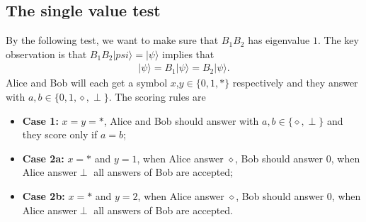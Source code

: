 \documentclass[11pt,letterpaper]{article}
\newcommand{\ket}[1]{|#1\rangle}
\newcommand{\bra}[1]{\langle#1|}
\DeclareMathOperator{\spn}{span}
\newcommand{\1}{\mathbb{1}}
\theoremstyle{definition}
\begin{document}
\subsection{The single value test}
By the following test, we want to make sure that $B_1B_2$ has eigenvalue $1$.
The key observation is that $B_1B_2\ket{psi} = \ket{\psi}$ implies that 
\begin{align}
	\ket{\psi} = B_1\ket{\psi} = B_2 \ket{\psi}.
\end{align}
Alice and Bob will each get a symbol $x$,$y \in \{ 0, 1, \ast\}$ respectively and they answer with $a,b \in \{0,1,\diamond,\perp\}$. 
The scoring rules are
\begin{itemize}
	\item \textbf{Case 1:} $x = y = \ast$, Alice and Bob should answer with $a, b \in \{\diamond, \perp\}$ and 
	they score only if $a = b$;
	\item \textbf{Case 2a:} $x =\ast$ and $y = 1$,  when Alice answer $\diamond$, Bob should answer $0$, when 
	Alice answer$\perp$ all answers of Bob are accepted;
	\item \textbf{Case 2b:} $x = \ast$ and $y = 2$,  when Alice answer $\diamond$, Bob should answer $0$, when 
	Alice answer$\perp$ all answers of Bob are accepted.
\end{itemize}
\end{document}
